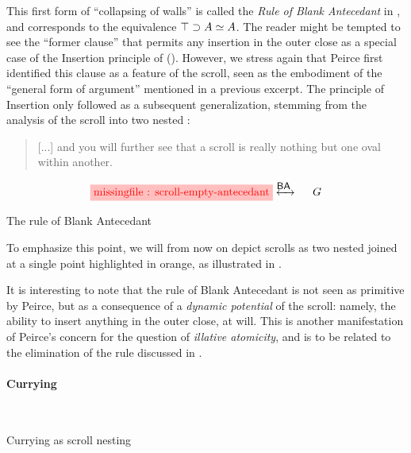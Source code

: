 \begin{scope}
This first form of ``collapsing of walls'' is called the \emph{Rule of Blank
Antecedant} in \cite{minghui_graphical_2019}, and corresponds  to
the equivalence $\top \supset A \simeq A$. The reader might be tempted to see
the ``former clause'' that permits any insertion in the outer close as a special
case of the Insertion principle of  (). However, we
stress again that Peirce first identified this clause as a feature of the
scroll, seen as the  embodiment of the ``general form of argument''
mentioned in a previous excerpt. The principle of Insertion only followed as a
subsequent generalization, stemming from the analysis of the scroll into two
nested  \cite[p.~535]{peirce_prolegomena_1906}:

\begin{quote}
  [...] and you will further see that a scroll is really nothing but one oval
within another.
\end{quote}

\begin{marginfigure}
  $$
  \!\!\!\!\stkfig{1}{scroll-empty-antecedant}
  \!\!\!\!\xinvstep{\rsf{BA}}~~~~
  G
  $$
  \caption{The rule of Blank Antecedant}
\end{marginfigure}

To emphasize this point, we will from now on depict scrolls as two nested 
joined at a single point highlighted in orange, as illustrated in
.

\begin{remark}
  It is interesting to note that the rule of Blank Antecedant is not seen as
  primitive by Peirce, but as a consequence of a \emph{dynamic potential} of the
  scroll: namely, the ability to insert anything in the outer close, at will.
  This is another manifestation of Peirce's concern for the question of
  \emph{illative atomicity}, and is to be related to the elimination of the
   rule discussed in .
\end{remark}

\paragraph{Currying}

\begin{marginfigure}[-10em]
  ~~~
  \caption{Currying as scroll nesting}
\end{marginfigure}


\end{scope}
